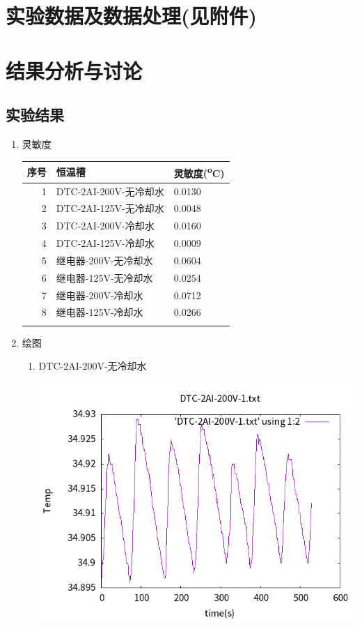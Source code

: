 \documentclass[11pt]{report}
\begin{document}
\chapter{实验数据及数据处理(见附件)}
\label{sec:org54f880c}
\chapter{结果分析与讨论}
\label{sec:org6eda7e4}
\section{实验结果}
\label{sec:org2ef71eb}
\begin{enumerate}
\item 灵敏度
\label{sec:orgddf91fe}
\begin{center}
\begin{tabular}{rll}
序号 & 恒温槽 & 灵敏度(\textsuperscript{o}C)\\
\hline
1 & DTC-2AI-200V-无冷却水 & \textpm{} 0.0130\\
2 & DTC-2AI-125V-无冷却水 & \textpm{} 0.0048\\
3 & DTC-2AI-200V-冷却水 & \textpm{} 0.0160\\
4 & DTC-2AI-125V-冷却水 & \textpm{} 0.0009\\
5 & 继电器-200V-无冷却水 & \textpm{} 0.0604\\
6 & 继电器-125V-无冷却水 & \textpm{} 0.0254\\
7 & 继电器-200V-冷却水 & \textpm{} 0.0712\\
8 & 继电器-125V-冷却水 & \textpm{} 0.0266\\
 &  & \\
\end{tabular}
\end{center}
\item 绘图
\label{sec:org57588aa}
\begin{enumerate}
\item DTC-2AI-200V-无冷却水
\label{sec:orgb031126}
\begin{center}
\includegraphics[width=.9\linewidth]{../img/DTC-2AI-200V-1.txt.png}

\end{center}
\end{enumerate}
\end{enumerate}
\end{document}
